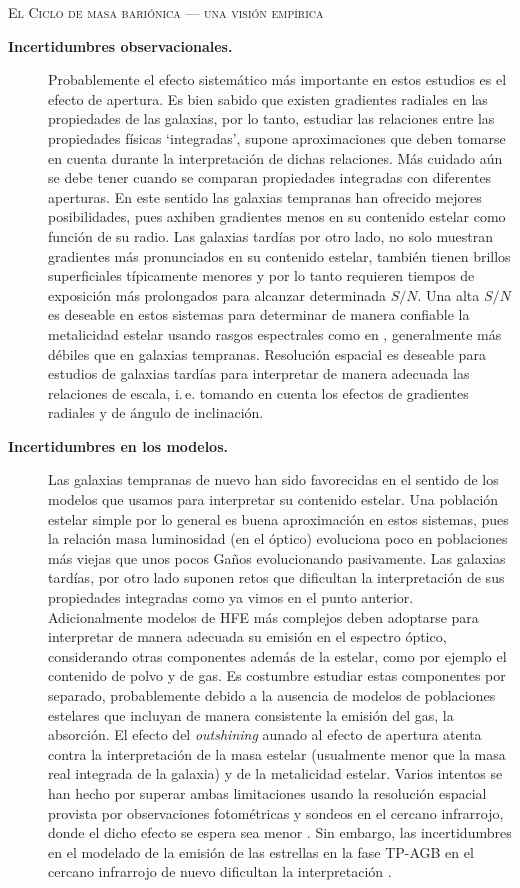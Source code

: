 \documentclass[xcolor=dvipsnames,4pt,hyperref={colorlinks,citecolor=black,linkcolor=black,urlcolor=black}]{beamer}
\begin{document}
\begin{frame}[allowframebreaks]{\textsc{El Ciclo de masa bariónica --- una visión empírica}}
\begin{description}
%
\item[\textbf{Incertidumbres observacionales.}] Probablemente el efecto sistemático más importante
en estos estudios es el efecto de apertura. Es bien sabido que existen gradientes radiales en las
propiedades de las galaxias, por lo tanto, estudiar las relaciones entre las propiedades físicas
`integradas', supone aproximaciones que deben tomarse en cuenta durante la interpretación de dichas
relaciones.
Más cuidado aún se debe tener cuando se comparan propiedades integradas con diferentes aperturas. En
este sentido las galaxias tempranas han ofrecido mejores posibilidades, pues axhiben gradientes
menos en su contenido estelar como función de su radio. Las galaxias tardías por otro lado, no solo
muestran gradientes más pronunciados en su contenido estelar, también tienen brillos superficiales
típicamente menores y por lo tanto requieren tiempos de exposición más prolongados para alcanzar
determinada $S/N$. Una alta $S/N$ es deseable en estos sistemas para determinar de manera confiable
la metalicidad estelar usando rasgos espectrales como en \citet{Gallazzi2005}, generalmente más
débiles que en galaxias tempranas. Resolución espacial es deseable para estudios de galaxias tardías
para interpretar de manera adecuada las relaciones de escala, i.\,e. tomando en cuenta los efectos
de gradientes radiales y de ángulo de inclinación.
%
\item[\textbf{Incertidumbres en los modelos.}] Las galaxias tempranas de nuevo han sido favorecidas
en el sentido de los modelos que usamos para interpretar su contenido estelar. Una población estelar
simple por lo general es buena aproximación en estos sistemas, pues la relación masa luminosidad (en
el óptico) evoluciona poco en poblaciones más viejas que unos pocos Gaños evolucionando pasivamente.
Las galaxias tardías, por otro lado suponen retos que dificultan la interpretación de sus
propiedades integradas como ya vimos en el punto anterior. Adicionalmente modelos de HFE más
complejos deben adoptarse para interpretar de manera adecuada su emisión en el espectro óptico,
considerando otras componentes además de la estelar, como por ejemplo el contenido de polvo y de
gas. Es costumbre estudiar estas componentes por separado, probablemente debido a la ausencia de
modelos de poblaciones estelares que incluyan de manera consistente la emisión del gas, la
absorción. El efecto del \emph{outshining} aunado al efecto de apertura atenta contra la
interpretación de la masa estelar (usualmente menor que la masa real integrada de la galaxia) y de
la metalicidad estelar. Varios intentos se han hecho por superar ambas limitaciones usando la
resolución espacial provista por observaciones fotométricas \citep{Sorba2015} y sondeos en el
cercano infrarrojo, donde el dicho efecto se espera sea menor \citep{Eminian2008}. Sin embargo, las
incertidumbres en el modelado de la emisión de las estrellas en la fase TP-AGB en el cercano
infrarrojo de nuevo dificultan la interpretación \citep{Zibetti2013}.
%
\end{description}


\end{frame}
\end{document}
